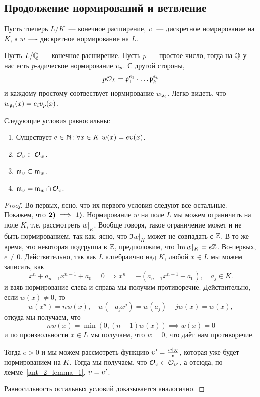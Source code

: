 	\subsection{Продолжение нормирований и ветвление}	


	Пусть тпеперь $L/K$~--- конечное расширение, $\v$~--- дискретное номрирование на $K$, а $w$~---- дискретное нормирование на $L$. 

	\begin{example}
		Пусть $L/\Q$~--- конечное расширение. Пусть $p$~--- простое число, тогда на $\Q$ у нас есть $p$-адическое нормирование $\v_{p}$. С другой стороны, 
		\[
			p\cO_{L} = \fp_{1}^{e_1} \cdot \ldots \fp_{k}^{e_k}
		\]
		и каждому простому соотвествует нормирование $w_{\fp_i}$. Легко видеть, что $w_{\fp_i}(x) = e_i \v_{p}(x)$. 
	\end{example}

	\begin{statement} 
		Следующие условия равносильны: 

		\begin{enumerate}
			\item Существует $e \in \N\colon \forall x \in K \ w(x) = e\v(x)$.

			\item $\cO_{\v} \subset \cO_{w}$.

			\item $\fm_{\v} \subset \fm_{w}$.

			\item $\fm_{\v} = \fm_{w} \cap \cO_{\v}$.
		\end{enumerate}
	\end{statement}
	\begin{proof}
		Во-первых, ясно, что их первого условия следуют все остальные. Покажем, что $\bf{2)} \implies \bf{1)}$. Нормирование $w$ на поле $L$ мы можем ограничить на поле $K$, т.е. рассмотреть $w\vert_{K}$. Вообще говоря, такое ограничение может и не быть нормированием, так как, ясно, что $\Im{w\vert_{K}}$ может не совпадать с $\Z$. В то же время, это некоторая подгруппа в $\Z$, предположим, что $\Im{w\vert_{K}} = e\Z$. Во-первых, $e \neq 0$. Действительно, так как $L$ алгебраично над $K$, любой $x \in L$ мы можем записать, как 
		\[
			x^n + a_{n - 1}x^{n - 1} + a_0 = 0 \implies x^n = -(a_{n - 1}x^{n - 1} + a_0), \quad a_j \in K.
		\]
		и взяв нормирование слева и справа мы получим противоречие. Действительно, если $w(x) \neq 0$, то 
		\[
			w(x^n) = nw(x) , \quad w(-a_j x^j) = w(a_j) + jw(x) = w(x),
		\]
		откуда мы получаем, что 
		\[
			nw(x) = \min(0, (n - 1)w(x)) \implies w(x) = 0
		\]
		и по произвольности $x \in L$ мы получаем, что $w = 0$, что даёт нам противоречие. 


		Тогда $e > 0$ и мы можем рассмотреть функцию $\v' = \frac{w\vert_{K}}{e}$, которая уже будет нормированием на $K$. Тогда мы получаем, что $\cO_{\v} \subset \cO_{\v'}$, а отсюда, по лемме~\ref{ant_2_lemma_1}, $\v = \v'$.  

		Равносильность остальных условий доказывается аналогично. 
	\end{proof}

